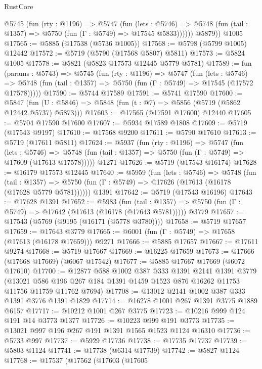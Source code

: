 \begin{lexlean}{RustCore}
\begin{coremodule}
          @5745
            (fun (rty : @1196) =>
            @5747
              (fun (lets : @5746) =>
              @5748 (fun (tail : @1357) => @5750 (fun (Γ : @5749) => @17545 @5833))))))
        @5879))
    @1005
@17565 := @5885 (@17538 (@5736 @1005))
@17568 := @5798 (@5799 @1005) @12442
@17572 := @5719 (@5790 (@17568 @5807) @5811)
@17573 := @5824 @1005
@17578 := @5821 (@5823 @17573 @12445 @5779 @5781)
@17589 := fun (params : @5743) =>
  @5745
    (fun (rty : @1196) =>
    @5747
      (fun (lets : @5746) =>
      @5748 (fun (tail : @1357) => @5750 (fun (Γ : @5749) => @17545 (@17572 @17578)))))
@17590 := @5744 @17589
@17591 := @5741 @17590
@17600 := @5847
    (fun (U : @5846) => @5848 (fun (t : @7) => @5856 (@5719 (@5862 @12442 @5737) @5873)))
@17603 := @17565 (@17591 @17600) @12440
@17605 := @5704 @17590 @17600
@17607 := @5934 @17589 @1808
@17609 := @5719 (@17543 @9197)
@17610 := @17568 @9200
@17611 := @5790 @17610
@17613 := @5719 (@17611 @5811)
@17624 := @5937
    (fun (rty : @1196) =>
    @5747
      (fun (lets : @5746) =>
      @5748 (fun (tail : @1357) => @5750 (fun (Γ : @5749) => @17609 (@17613 @17578)))))
    @1271
@17626 := @5719 (@17543 @16174)
@17628 := @16179 @17573 @12445
@17640 := @5959
    (fun (lets : @5746) =>
    @5748
      (fun (tail : @1357) =>
      @5750 (fun (Γ : @5749) => @17626 (@17613 (@16178 (@17628 @5779 @5781))))))
    @1391
@17642 := @5719 (@17543 @16196)
@17643 := @17628 @1391
@17652 := @5983
    (fun (tail : @1357) => @5750 (fun (Γ : @5749) => @17642 (@17613 (@16178 (@17643 @5781)))))
    @3779
@17657 := @17543 (@5769 (@9195 (@16171 (@5778 @3780))))
@17658 := @5719 @17657
@17659 := @17643 @3779
@17665 := @6001 (fun (Γ : @5749) => @17658 (@17613 (@16178 @17659))) @9271
@17666 := @5885 @17657
@17667 := @17611 @9274
@17668 := @5719 @17667
@17669 := @16225 @17659
@17673 := @17666 (@17668 @17669) (@6067 @17542)
@17677 := @5885 @17667 @17669 (@6072 @17610)
@17700 := @12877
    @588
    @1002
    @387
    @333
    @1391
    @2141
    @1391
    @3779
    (@13021 @586 @196 @267 @184 @1391 @1459 @1523 @876 @16262 @11753 @11756 @11759 @11762 @7694)
@17708 := @13012 @2141 @1002 @387 @333 @1391 @3776 @1391 @1829
@17714 := @16278 @1001 @267 @1391 @3775 @1889 @6157
@17717 := @10212 @1001 @267 @3775
@17723 := @10216 @999 @124 @191 @14 @3773 @1377
@17726 := @10223 @999 @191 @3773
@17735 := @13021 @997 @196 @267 @191 @1391 @1565 @1523 @1124 @16310
@17736 := @5733 @997
@17737 := @5929 @17736
@17738 := @17735 @17737
@17739 := @5803 @1124
@17741 := @17738 (@6314 @17739)
@17742 := @5827 @1124
@17768 := @17537
    (@17562
      (@17603
        (@17605

\end{coremodule}
\end{lexlean}
